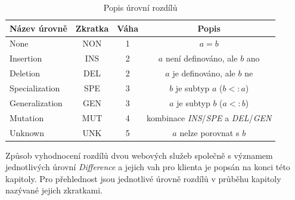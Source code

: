 \documentclass[czech,DP]{thesiskiv}
\begin{document}
\begin{table}[h]
	\centering
	\begin{tabular}{|l|c|c|c|}
		\hline
		Název úrovně & Zkratka & Váha & Popis \\
		\hline
		\hline
		None & NON & 1 & $a = b$ \\
		\hline
		Insertion & INS & 2 & $a$ není definováno, ale $b$ ano \\
		\hline
		Deletion & DEL & 2 & $a$ je definováno, ale $b$ ne \\
		\hline
		Specialization & SPE & 3 & $b$ je subtyp $a$ ($b <: a$) \\
		\hline
		Generalization & GEN & 3& $a$ je subtyp $b$ ($a <: b$) \\
		\hline
		Mutation & MUT & 4 & kombinace \textit{INS}/\textit{SPE} a \textit{DEL}/\textit{GEN} \\
		\hline
		Unknown & UNK & 5 & $a$ nelze porovnat s $b$ \\
		\hline
	\end{tabular}
	\caption{Popis úrovní rozdílů}
	\label{tab:diffs}
\end{table} 

Způsob vyhodnocení rozdílů dvou webových služeb společně s významem jednotlivých úrovní \textit{Difference} a jejich vah pro klienta je popsán na konci této kapitoly. Pro přehlednost jsou jednotlivé úrovně rozdílů v průběhu kapitoly nazývané jejich zkratkami. 


\end{document}
